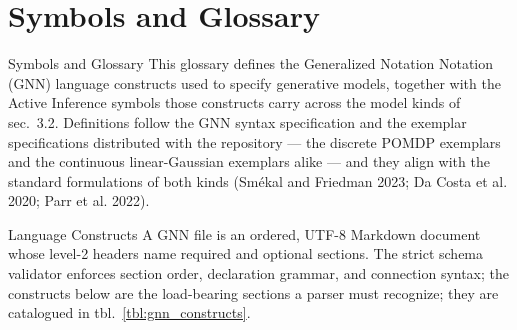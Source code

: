 \documentclass[
  ignorenonframetext,
]{beamer}
\author{\texorpdfstring{}{}}
\date{}
\begin{document}
\section{Symbols and Glossary}\label{sec:symbols_glossary}

\begin{frame}[allowframebreaks]{Symbols and Glossary}
This glossary defines the Generalized Notation Notation (GNN) language
constructs used to specify generative models, together with the Active
Inference symbols those constructs carry across the model kinds of
sec.~3.2. Definitions follow the GNN syntax
specification and the exemplar specifications distributed with the
repository --- the discrete POMDP exemplars and the continuous
linear-Gaussian exemplars alike --- and they align with the standard
formulations of both kinds (Smékal and Friedman 2023; Da Costa et al.
2020; Parr et al. 2022).
\end{frame}

\begin{frame}{Language Constructs}
\protect{}\label{language-constructs}
A GNN file is an ordered, UTF-8 Markdown document whose level-2 headers
name required and optional sections. The strict schema validator
enforces section order, declaration grammar, and connection syntax; the
constructs below are the load-bearing sections a parser must recognize;
they are catalogued in tbl.~\ref{tbl:gnn_constructs}.

\end{frame}
\end{document}

